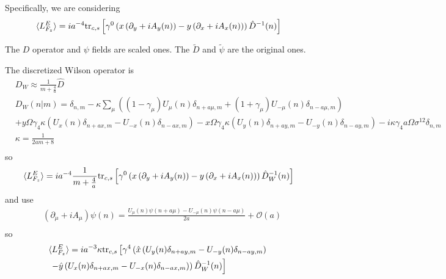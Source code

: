 Specifically, we are considering
\begin{equation}
\begin{split}
&\langle L^E_{F_z}\rangle=ia^{-4}{\rm tr}_{c,s}\left[\gamma ^0 \left(x\left(\partial _{y}+iA_{y}(n)\right)-y\left(\partial _{x}+iA_{x}(n)\right)\right)\hat{D}^{-1}(n)\right]\\
\end{split}
\end{equation}

The $D$ operator and $\psi$ fields are scaled ones. The $\tilde{D}$ and $\tilde{\psi}$ are the original ones.

The discretized Wilson operator is
\begin{equation}
\begin{split}
&D_W\approx\frac{1}{m+\frac{4}{a}}\hat{D}\\
&D_W(n|m)=\delta _{n,m}-\kappa\sum _{\mu}\left((1-\gamma _{\mu})U_{\mu}(n)\delta _{n+a\mu,m}+(1+\gamma _{\mu})U_{-\mu}(n)\delta _{n-a\mu,m}\right)\\
&+y\Omega \gamma _4\kappa\left(U_{x}(n)\delta _{n+ax,m}-U_{-x}(n)\delta _{n-ax,m}\right)-x\Omega \gamma _4\kappa\left(U_{y}(n)\delta _{n+ay,m}-U_{-y}(n)\delta _{n-ay,m}\right) -i\kappa\gamma _4a\Omega \sigma ^{12}\delta _{n,m}\\
&\kappa=\frac{1}{2am+8}\\
\end{split}
\end{equation}
so
\begin{equation}
\begin{split}
&\langle L^E_{F_z}\rangle=ia^{-4}\frac{1}{m+\frac{4}{a}}{\rm tr}_{c,s}\left[\gamma ^0 \left(x\left(\partial _{y}+iA_{y}(n)\right)-y\left(\partial _{x}+iA_{x}(n)\right)\right)\hat{D}_W^{-1}(n)\right]\\
\end{split}
\end{equation}
and use
\begin{equation}
\begin{split}
&(\partial _{\mu}+iA_{\mu})\psi(n)= \frac{U_{\mu}(n)\psi(n+a\mu)-U_{-\mu}(n)\psi(n-a\mu)}{2a}+\mathcal{O}(a)\\
\end{split}
\end{equation}
so\textcolor[rgb]{0,0,1}{
\begin{equation}
\begin{split}
&\langle L^E_{F_z}\rangle=ia^{-3}\kappa {\rm tr}_{c,s}\left[\gamma ^4 \left(\hat{x} \left(U_y(n)\delta _{n+ay,m}-U_{-y}(n)\delta _{n-ay,m}\right)\right.\right.\\
&\left.\left.-\hat{y} \left(U_{x}(n)\delta _{n+ax,m}-U_{-x}(n)\delta _{n-ax,m}\right)\right)\hat{D}_W^{-1}(n)\right]\\
\end{split}
\end{equation}
}


